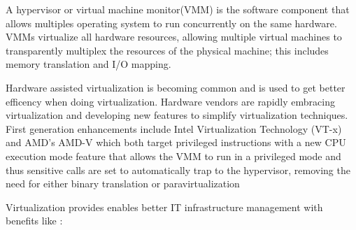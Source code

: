 \documentclass[12pt,a4paper]{report}
\begin{document}


A hypervisor or virtual machine monitor(VMM) is the software component that allows multiples operating system to run
concurrently on the same hardware. VMMs virtualize all hardware resources, allowing multiple virtual machines to transparently multiplex the resources of the physical machine; this includes memory translation and I/O mapping.

Hardware assisted virtualization is becoming common and is used to get better efficency when doing virtualization. Hardware vendors are rapidly embracing virtualization and developing new features
to simplify virtualization techniques. First generation enhancements include Intel
Virtualization Technology (VT-x) and AMD's AMD-V which both target privileged 
instructions with a new CPU execution mode feature that allows the VMM to run in a privileged mode and thus  sensitive calls are set to automatically trap to the hypervisor, removing the need for either binary translation or paravirtualization \cite{website:vmware}



Virtualization provides enables better IT infrastructure management with benefits like \cite{website:intel-VT}:
\end{document}
